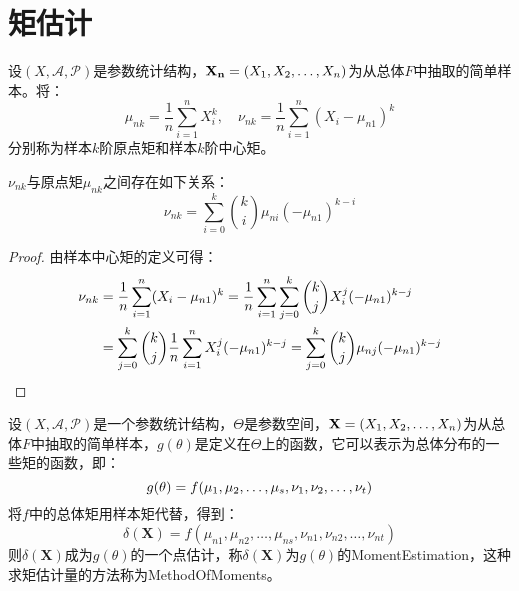 \section{矩估计}

\begin{definition}
	设$(X,\mathscr{A},\mathscr{P})$是参数统计结构，$\mathbf{X_n}=(X_1, X_2, \dots, X_{n})$为从总体$F$中抽取的简单样本。将：
	\begin{equation*}
		\mu_{nk}=\frac{1}{n}\sum_{i=1}^{n}X_i^k,\quad
		\nu_{nk}=\frac{1}{n}\sum_{i=1}^{n}(X_i-\mu_{n1})^k
	\end{equation*}
	分别称为样本$k$阶原点矩和样本$k$阶中心矩。
\end{definition}
\begin{theorem}\label{theo:SampleMoment}
	$\nu_{nk}$与原点矩$\mu_{nk}$之间存在如下关系：
	\begin{equation*}
		\nu_{nk}=\sum_{i=0}^{k}\binom{k}{i}\mu_{ni}(-\mu_{n1})^{k-i}
	\end{equation*}
\end{theorem}
\begin{proof}
	由样本中心矩的定义可得：
	\begin{align*}
		\nu_{nk}
		&=\frac{1}{n}\sum_{i=1}^{n}(X_i-\mu_{n1})^k
		=\frac{1}{n}\sum_{i=1}^{n}\sum_{j=0}^{k}\binom{k}{j}X_i^j(-\mu_{n1})^{k-j} \\
		&=\sum_{j=0}^{k}\binom{k}{j}\frac{1}{n}\sum_{i=1}^{n}X_i^j(-\mu_{n1})^{k-j}
		=\sum_{j=0}^{k}\binom{k}{j}\mu_{nj}(-\mu_{n1})^{k-j}\qedhere
	\end{align*}
\end{proof}
\begin{definition}
	设$(X,\mathscr{A},\mathscr{P})$是一个参数统计结构，$\Theta$是参数空间，$\mathbf{X}=(X_1, X_2, \dots, X_{n})$为从总体$F$中抽取的简单样本，$g(\theta)$是定义在$\Theta$上的函数，它可以表示为总体分布的一些矩的函数，即：
	\begin{equation*}
		g(\theta)=f(\mu_1, \mu_2, \dots, \mu_{s},\nu_1, \nu_2, \dots, \nu_{t})
	\end{equation*}
	将$f$中的总体矩用样本矩代替，得到：
	\begin{equation*}
		\delta(\mathbf{X})=f(\mu_{n1},\mu_{n2},\dots,\mu_{ns},\nu_{n1},\nu_{n2},\dots,\nu_{nt})
	\end{equation*}
	则$\delta(\mathbf{X})$成为$g(\theta)$的一个点估计，称$\delta(\mathbf{X})$为$g(\theta)$的\gls{MomentEstimation}，这种求矩估计量的方法称为\gls{MethodOfMoments}。
\end{definition}
